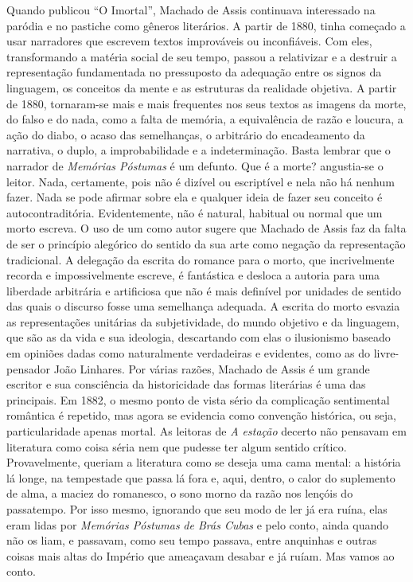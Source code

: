 Quando publicou ``O Imortal'', Machado de Assis continuava interessado na
paródia e no pastiche como gêneros literários. A partir de 1880, tinha
começado a usar narradores que escrevem textos improváveis ou
inconfiáveis. Com eles, transformando a matéria social de seu tempo,
passou a relativizar e a destruir a representação fundamentada no
pressuposto da adequação entre os signos da linguagem, os conceitos da
mente e as estruturas da realidade objetiva. A partir de 1880,
tornaram-se mais e mais frequentes nos seus textos as imagens da morte,
do falso e do nada, como a falta de memória, a equivalência de razão e
loucura, a ação do diabo, o acaso das semelhanças, o arbitrário do
encadeamento da narrativa, o duplo, a improbabilidade e a
indeterminação. Basta lembrar que o narrador de \emph{Memórias Póstumas}
é um defunto. Que é a morte? angustia-se o leitor. Nada, certamente,
pois não é dizível ou escriptível e nela não há nenhum fazer. Nada se
pode afirmar sobre ela e qualquer ideia de fazer seu conceito é
autocontraditória. Evidentemente, não é natural, habitual ou normal que
um morto escreva. O uso de um como autor sugere que Machado de Assis faz
da falta de ser o princípio alegórico do sentido da sua arte como
negação da representação tradicional. A delegação da escrita do romance
para o morto, que incrivelmente recorda e impossivelmente escreve, é
fantástica e desloca a autoria para uma liberdade arbitrária e
artificiosa que não é mais definível por unidades de sentido das quais o
discurso fosse uma semelhança adequada. A escrita do morto esvazia as
representações unitárias da subjetividade, do mundo objetivo e da
linguagem, que são as da vida e sua ideologia, descartando com elas o
ilusionismo baseado em opiniões dadas como naturalmente verdadeiras e
evidentes, como as do livre-pensador João Linhares. Por várias razões,
Machado de Assis é um grande escritor e sua consciência da historicidade
das formas literárias é uma das principais. Em 1882, o mesmo ponto de
vista sério da complicação sentimental romântica é repetido, mas agora
se evidencia como convenção histórica, ou seja, particularidade apenas
mortal. As leitoras de \emph{A estação} decerto não pensavam em
literatura como coisa séria nem que pudesse ter algum sentido crítico.
Provavelmente, queriam a literatura como se deseja uma cama mental: a
história lá longe, na tempestade que passa lá fora e, aqui, dentro, o
calor do suplemento de alma, a maciez do romanesco, o sono morno da
razão nos lençóis do passatempo. Por isso mesmo, ignorando que seu modo
de ler já era ruína, elas eram lidas por \emph{Memórias Póstumas}
\emph{de Brás Cubas} e pelo conto, ainda quando não os liam, e passavam,
como seu tempo passava, entre anquinhas e outras coisas mais altas do
Império que ameaçavam desabar e já ruíam. Mas vamos ao conto.

